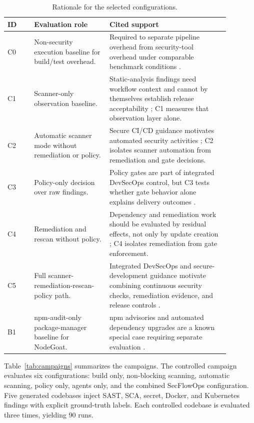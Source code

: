 \begin{table}[t]
\centering
\footnotesize
\caption{Rationale for the selected configurations.}
\label{tab:config-rationale}
\begin{tabular}{@{}lp{0.34\linewidth}p{0.54\linewidth}@{}}
\toprule
ID & Evaluation role & Cited support \\
\midrule
C0 & Non-security execution baseline for build/test overhead. & Required to separate pipeline overhead from security-tool overhead under comparable benchmark conditions \cite{pariziBenchmark2018}. \\
C1 & Scanner-only observation baseline. & Static-analysis findings need workflow context and cannot by themselves establish release acceptability \cite{johnsonStaticAnalysis2013,bellerStaticAnalysis2016}; C1 measures that observation layer alone. \\
C2 & Automatic scanner mode without remediation or policy. & Secure CI/CD guidance motivates automated security activities \cite{nistSP800204D,nistSSDF,owaspSAMM}; C2 isolates scanner automation from remediation and gate decisions. \\
C3 & Policy-only decision over raw findings. & Policy gates are part of integrated DevSecOps control, but C3 tests whether gate behavior alone explains delivery outcomes \cite{nistSP800204D,opaDocs}. \\
C4 & Remediation and rescan without policy. & Dependency and remediation work should be evaluated by residual effects, not only by update creation \cite{decanNpm2018,mirhosseiniPullRequests2017}; C4 isolates remediation from gate enforcement. \\
C5 & Full scanner-remediation-rescan-policy path. & Integrated DevSecOps and secure-development guidance motivate combining continuous security checks, remediation evidence, and release controls \cite{nistSP800204D,nistSSDF,owaspSAMM}. \\
B1 & npm-audit-only package-manager baseline for NodeGoat. & npm advisories and automated dependency upgrades are a known special case requiring separate evaluation \cite{npmAudit,decanNpm2018,mirhosseiniPullRequests2017}. \\
\bottomrule
\end{tabular}
\end{table}

Table~\ref{tab:campaigns} summarizes the campaigns. The controlled campaign evaluates six configurations: build only, non-blocking scanning, automatic scanning, policy only, agents only, and the combined SecFlowOps configuration. Five generated codebases inject SAST, SCA, secret, Docker, and Kubernetes findings with explicit ground-truth labels. Each controlled codebase is evaluated three times, yielding 90 runs.

